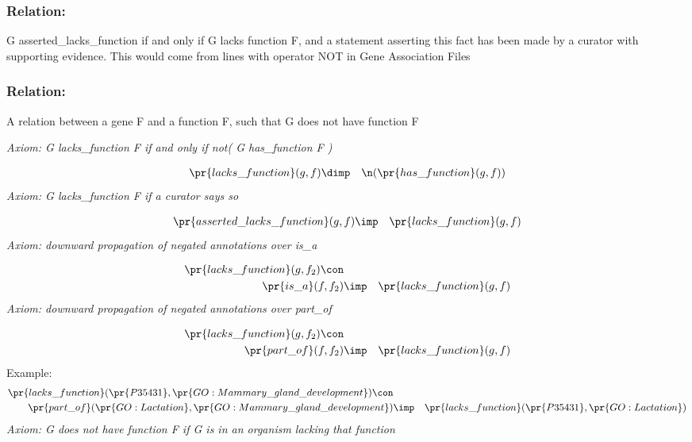 \subsubsection{Relation:  }


G asserted\_lacks\_function if
and only if G lacks function F, and a statement asserting this fact
has been made by a curator with supporting evidence. This would come
from lines with operator NOT in Gene Association Files

\subsubsection{Relation:  }


A relation between a gene F and a function F, such that G does not have function F

\emph{Axiom: G lacks\_function F if and only if not( G has\_function F )}

\begin{eqnarray*}
 \pr{lacks\_function}(g, f) &\dimp & \n( \pr{has\_function}(g, f) )
\end{eqnarray*}
\emph{Axiom: G lacks\_function F if a curator says so}

\begin{eqnarray*}
 \pr{asserted\_lacks\_function}(g, f) &\imp & \pr{lacks\_function}(g, f) 
\end{eqnarray*}
\emph{Axiom: downward propagation of negated annotations over is\_a}

\begin{eqnarray*}
 \pr{lacks\_function}(g, f_2) \con \\
 \pr{is\_a}(f, f_2) &\imp & \pr{lacks\_function}(g, f) 
\end{eqnarray*}
\emph{Axiom: downward propagation of negated annotations over part\_of}

\begin{eqnarray*}
 \pr{lacks\_function}(g, f_2) \con \\
 \pr{part\_of}(f, f_2) &\imp & \pr{lacks\_function}(g, f) 
\end{eqnarray*}
Example: \begin{eqnarray*}
 \pr{lacks\_function}( \pr{P35431},  \pr{GO:Mammary\_gland\_development}) \con \\
 \pr{part\_of}( \pr{GO:Lactation},  \pr{GO:Mammary\_gland\_development}) &\imp & \pr{lacks\_function}( \pr{P35431},  \pr{GO:Lactation}) 
\end{eqnarray*}
\emph{Axiom: G does not have function F if G is in an organism lacking that function}

